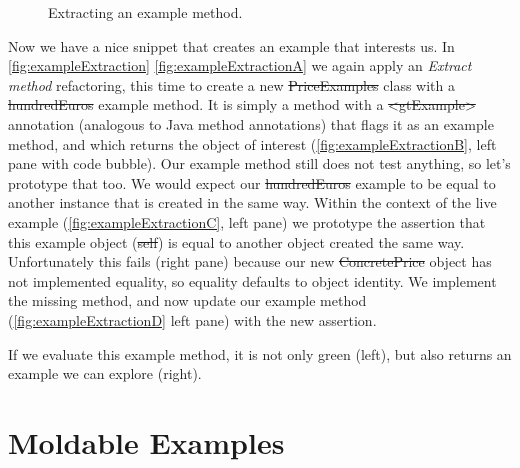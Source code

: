\documentclass[sigplan,anonymous,review,10pt]{acmart}
\begin{document}
\begin{figure}[t]
\centering
{}\qquad
{}\qquad
{}\qquad
{}\qquad
  \caption{Extracting an example method.}
  \label{fig:exampleExtraction}
\end{figure}

Now we have a nice snippet that creates an example that interests us.
In \autoref{fig:exampleExtraction} \autoref{fig:exampleExtractionA} we again apply an \emph{Extract method} refactoring, this time to create a new \st{PriceExamples} class with a \st{hundredEuros} example  method.
It is simply a method with a \st{<gtExample>} annotation (analogous to Java method annotations) that flags it as an example method, and which returns the object of interest (\autoref{fig:exampleExtractionB}, left pane with code bubble).
Our example method still does not test anything, so let's prototype that too.
We would expect our \st{hundredEuros} example to be equal to another instance that is created in the same way.
Within the context of the live example (\autoref{fig:exampleExtractionC}, left pane) we prototype the assertion that this example object (\ie \st{self}) is equal to another object created the same way.
Unfortunately this fails (right pane) because our new \st{ConcretePrice} object has not implemented equality, so equality defaults to object identity.
We implement the missing method, and now update our example method (\autoref{fig:exampleExtractionD} left pane) with the new assertion.

If we evaluate this example method, it is not only green (left), but also returns an example we can explore (right).

\section{Moldable Examples}\label{sec:moldable}
\end{document}
